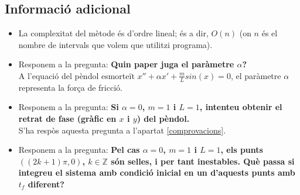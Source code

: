 \documentclass[a4paper, 11pt]{article}
\begin{document}
\subsection{Informació adicional}
\begin{itemize}
    \item  La complexitat del mètode és d'ordre lineal; és a dir, $O(n)$ (on $n$ és el nombre de intervals que volem que utilitzi programa).

   \item Responem a la pregunta: \textbf{Quin paper juga el paràmetre $\alpha$?}\\
   A l'equació del pèndol esmorteït $x'' + \alpha x' + \frac{m}{L}sin(x) = 0$, el paràmetre $\alpha$ representa la força de fricció.
   
   
   \item Responem a la pregunta: \textbf{Si $\alpha = 0$, $m=1$ i $L=1$, intenteu obtenir el retrat de fase (gràfic en $x$ i $y$) del pèndol.}\\
    S'ha respòs aquesta pregunta a l'apartat \textcolor{blue}{\ref{comprovacions}}.
   
   \newpage
   
  \item Responem a la pregunta: \textbf{Pel cas $\alpha=0$, $m=1$ i $L=1$, els punts $((2k+1)\pi, 0)$, $k\in \mathbb{Z}$ són selles, i per tant inestables. Què passa si integreu el sistema amb condició inicial en un d'aquests punts amb $t_f$ diferent?}\\
  

\end{itemize}
\end{document}
